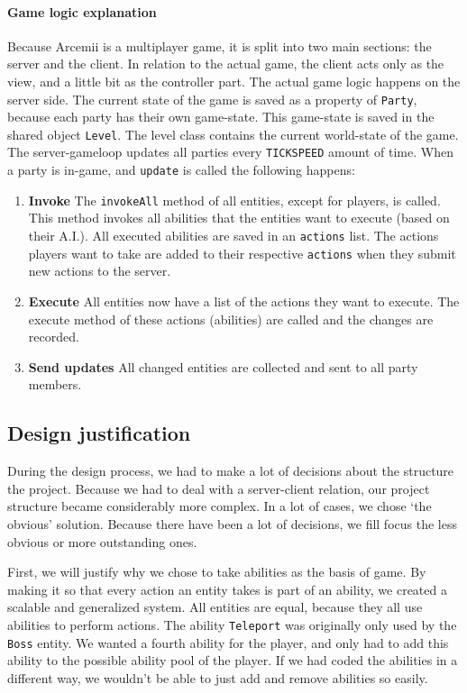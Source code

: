 \documentclass[../main.tex]{subfiles}
\begin{document}
        \paragraph{Game logic explanation}
        Because Arcemii is a multiplayer game, it is split into two main sections: the server and the client. In relation to the actual game, the client acts only as the view, and a little bit as the controller part. The actual game logic happens on the server side. The current state of the game is saved as a property of \texttt{Party}, because each party has their own game-state. This game-state is saved in the shared object \texttt{Level}. The level class contains the current world-state of the game. The server-gameloop updates all parties every \texttt{TICKSPEED} amount of time. When a party is in-game, and \texttt{update} is called the following happens:

        \begin{enumerate}
            \item \textbf{Invoke} The \texttt{invokeAll} method of all entities, except for players, is called. This method invokes all abilities that the entities want to execute (based on their A.I.). All executed abilities are saved in an \texttt{actions} list. The actions players want to take are added to their respective \texttt{actions} when they submit new actions to the server.
            \item \textbf{Execute} All entities now have a list of the actions they want to execute. The execute method of these actions (abilities) are called and the changes are recorded.
            \item \textbf{Send updates} All changed entities are collected and sent to all party members.
        \end{enumerate}
        
    \pagebreak 
	\subsection{Design justification}
    During the design process, we had to make a lot of decisions about the structure the project. Because we had to deal with a server-client relation, our project structure became considerably more complex. In a lot of cases, we chose `the obvious' solution. Because there have been a lot of decisions, we fill focus the less obvious or more outstanding ones.
    
    First, we will justify why we chose to take abilities as the basis of game. By making it so that every action an entity takes is part of an ability, we created a scalable and generalized system. All entities are equal, because they all use abilities to perform actions. The ability \texttt{Teleport} was originally only used by the \texttt{Boss} entity. We wanted a fourth ability for the player, and only had to add this ability to the possible ability pool of the player. If we had coded the abilities in a different way, we wouldn't be able to just add and remove abilities so easily.
    
\end{document}
